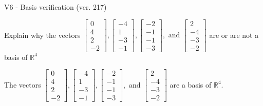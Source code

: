 \begin{exercise}
  \begin{exerciseTitle}V6 - Basis verification (ver. 217)\end{exerciseTitle}
  \begin{exerciseStatement}
    Explain why the vectors \(\left[\begin{array}{r}
0 \\
4 \\
2 \\
-2
\end{array}\right] , \left[\begin{array}{r}
-4 \\
1 \\
-3 \\
-1
\end{array}\right] , \left[\begin{array}{r}
-2 \\
-1 \\
-1 \\
-3
\end{array}\right] , \text{ and } \left[\begin{array}{r}
2 \\
-4 \\
-3 \\
-2
\end{array}\right]\) are or are not a basis of \(\mathbb{R}^4\)	


  \end{exerciseStatement}
  \begin{exerciseAnswer}
   The vectors \(\left[\begin{array}{r}
0 \\
4 \\
2 \\
-2
\end{array}\right] , \left[\begin{array}{r}
-4 \\
1 \\
-3 \\
-1
\end{array}\right] , \left[\begin{array}{r}
-2 \\
-1 \\
-1 \\
-3
\end{array}\right] , \text{ and } \left[\begin{array}{r}
2 \\
-4 \\
-3 \\
-2
\end{array}\right]\) 
  	 are  a basis of \(\mathbb{R}^4\).
  


  \end{exerciseAnswer}
\end{exercise}